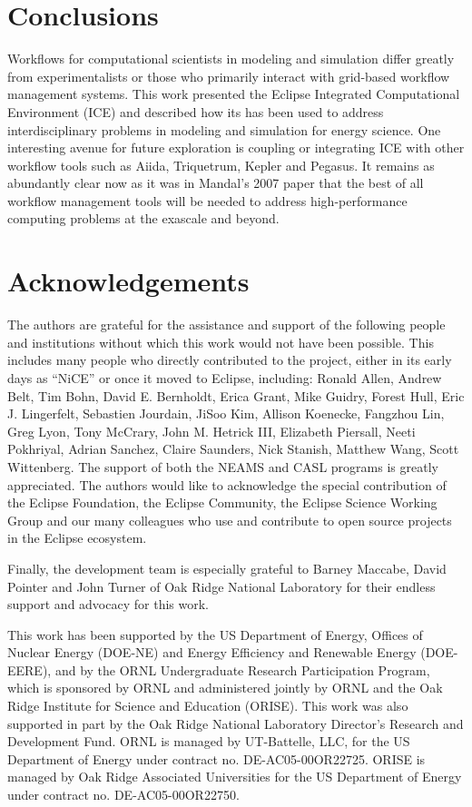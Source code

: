 \section{Conclusions}\label{conclusions}

Workflows for computational scientists in modeling and simulation differ
greatly from experimentalists or those who primarily interact with
grid-based workflow management systems. This work presented the Eclipse
Integrated Computational Environment (ICE) and described how its has
been used to address interdisciplinary problems in modeling and
simulation for energy science. One interesting avenue for future
exploration is coupling or integrating ICE with other workflow tools
such as Aiida, Triquetrum, Kepler and Pegasus. It remains as abundantly
clear now as it was in Mandal's 2007 paper that the best of all workflow
management tools will be needed to address high-performance computing
problems at the exascale and beyond.

\section*{Acknowledgements}\label{acknowledgements}

The authors are grateful for the assistance and support of the following
people and institutions without which this work would not have been
possible. This includes many people who directly contributed to the
project, either in its early days as ``NiCE'' or once it moved to
Eclipse, including: Ronald Allen, Andrew Belt, Tim Bohn, David E.
Bernholdt, Erica Grant, Mike Guidry, Forest Hull, Eric J. Lingerfelt,
Sebastien Jourdain, JiSoo Kim, Allison Koenecke, Fangzhou Lin, Greg
Lyon, Tony McCrary, John M. Hetrick III, Elizabeth Piersall, Neeti
Pokhriyal, Adrian Sanchez, Claire Saunders, Nick Stanish, Matthew Wang,
Scott Wittenberg. The support of both the NEAMS and CASL programs is
greatly appreciated. The authors would like to acknowledge the special
contribution of the Eclipse Foundation, the Eclipse Community, the
Eclipse Science Working Group and our many colleagues who use and
contribute to open source projects in the Eclipse ecosystem.

Finally, the development team is especially grateful to Barney Maccabe,
David Pointer and John Turner of Oak Ridge National Laboratory for their
endless support and advocacy for this work.

This work has been supported by the US Department of Energy, Offices of
Nuclear Energy (DOE-NE) and Energy Efficiency and Renewable Energy
(DOE-EERE), and by the ORNL Undergraduate Research Participation
Program, which is sponsored by ORNL and administered jointly by ORNL and
the Oak Ridge Institute for Science and Education (ORISE). This work was
also supported in part by the Oak Ridge National Laboratory Director's
Research and Development Fund. ORNL is managed by UT-Battelle, LLC, for
the US Department of Energy under contract no. DE-AC05-00OR22725. ORISE
is managed by Oak Ridge Associated Universities for the US Department of
Energy under contract no. DE-AC05-00OR22750.

